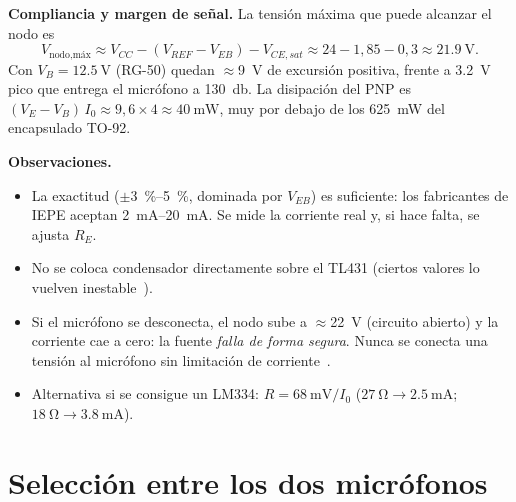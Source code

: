\documentclass[11pt,a4paper]{article}
\begin{document}
\textbf{Compliancia y margen de señal.} La tensión máxima que puede alcanzar el nodo es
\begin{equation}
  V_{\text{nodo,máx}} \approx V_{CC} - (V_{REF}-V_{EB}) - V_{CE,sat} \approx 24 - 1{,}85 - 0{,}3 \approx \SI{21.9}{\volt}.
\end{equation}
Con $V_B=\SI{12.5}{\volt}$ (RG-50) quedan $\approx$\SI{9}{\volt} de excursión positiva, frente a \SI{3.2}{\volt} pico que
entrega el micrófono a \SI{130}{\decibel}. La disipación del PNP es $(V_E-V_B)\,I_0\approx 9{,}6\times 4\approx\SI{40}{\milli\watt}$,
muy por debajo de los \SI{625}{\milli\watt} del encapsulado TO-92.

\textbf{Observaciones.}
\begin{itemize}
  \item La exactitud ($\pm$\SIrange{3}{5}{\percent}, dominada por $V_{EB}$) es suficiente: los fabricantes de IEPE aceptan
        \SIrange{2}{20}{\milli\ampere}. Se mide la corriente real y, si hace falta, se ajusta $R_E$.
  \item No se coloca condensador directamente sobre el TL431 (ciertos valores lo vuelven inestable~\cite{tl431}).
  \item Si el micrófono se desconecta, el nodo sube a $\approx$\SI{22}{\volt} (circuito abierto) y la corriente cae a cero:
        la fuente \emph{falla de forma segura}. Nunca se conecta una tensión al micrófono sin limitación de corriente~\cite{pcbguide}.
  \item Alternativa si se consigue un LM334: $R=\SI{68}{\milli\volt}/I_0$ ($\SI{27}{\ohm}\to\SI{2.5}{\milli\ampere}$; $\SI{18}{\ohm}\to\SI{3.8}{\milli\ampere}$).
\end{itemize}

\section{Selección entre los dos micrófonos}
\end{document}

